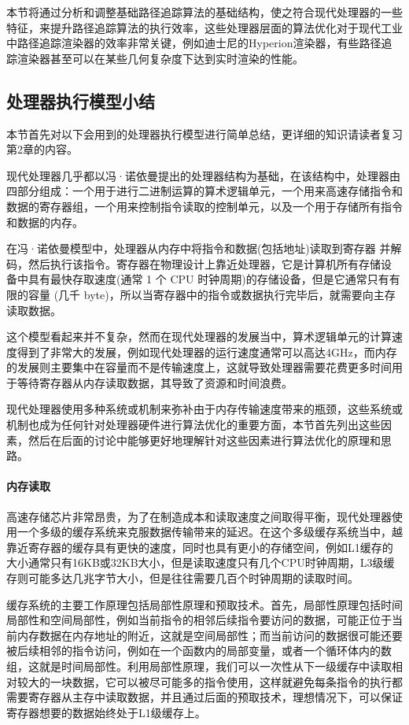 本节将通过分析和调整基础路径追踪算法的基础结构，使之符合现代处理器的一些特征，来提升路径追踪算法的执行效率，这些处理器层面的算法优化对于现代工业中路径追踪渲染器的效率非常关键，例如迪士尼的Hyperion渲染器，有些路径追踪渲染器甚至可以在某些几何复杂度下达到实时渲染的性能。






\subsection{处理器执行模型小结}
本节首先对以下会用到的处理器执行模型进行简单总结，更详细的知识请读者复习第2章的内容。

现代处理器几乎都以冯·诺依曼提出的处理器结构为基础，在该结构中，处理器由四部分组成：一个用于进行二进制运算的算术逻辑单元，一个用来高速存储指令和数据的寄存器组，一个用来控制指令读取的控制单元，以及一个用于存储所有指令和数据的内存。

在冯·诺依曼模型中，处理器从内存中将指令和数据(包括地址)读取到寄存器 并解码，然后执行该指令。寄存器在物理设计上靠近处理器，它是计算机所有存储设 备中具有最快存取速度(通常 1 个 CPU 时钟周期)的存储设备，但是它通常只有有 限的容量 (几千 byte)，所以当寄存器中的指令或数据执行完毕后，就需要向主存读取数据。

这个模型看起来并不复杂，然而在现代处理器的发展当中，算术逻辑单元的计算速度得到了非常大的发展，例如现代处理器的运行速度通常可以高达4GHz，而内存的发展则主要集中在容量而不是传输速度上，这就导致处理器需要花费更多时间用于等待寄存器从内存读取数据，其导致了资源和时间浪费。

现代处理器使用多种系统或机制来弥补由于内存传输速度带来的瓶颈，这些系统或机制也成为任何针对处理器硬件进行算法优化的重要方面，本节首先列出这些因素，然后在后面的讨论中能够更好地理解针对这些因素进行算法优化的原理和思路。




\paragraph{内存读取}
高速存储芯片非常昂贵，为了在制造成本和读取速度之间取得平衡，现代处理器使用一个多级的缓存系统来克服数据传输带来的延迟。在这个多级缓存系统当中，越靠近寄存器的缓存具有更快的速度，同时也具有更小的存储空间，例如L1缓存的大小通常只有16KB或32KB大小，但是读取速度只有几个CPU时钟周期，L3级缓存则可能多达几兆字节大小，但是往往需要几百个时钟周期的读取时间。

缓存系统的主要工作原理包括局部性原理和预取技术。首先，局部性原理包括时间局部性和空间局部性，例如当前指令的相邻后续指令要访问的数据，可能正位于当前内存数据在内存地址的附近，这就是空间局部性；而当前访问的数据很可能还要被后续相邻的指令访问，例如在一个函数内的局部变量，或者一个循环体内的数组，这就是时间局部性。利用局部性原理，我们可以一次性从下一级缓存中读取相对较大的一块数据，它可以被尽可能多的指令使用，这样就避免每条指令的执行都需要寄存器从主存中读取数据，并且通过后面的预取技术，理想情况下，可以保证寄存器想要的数据始终处于L1级缓存上。

